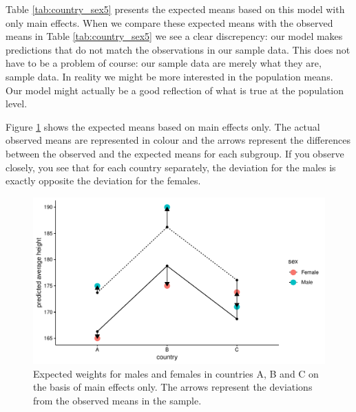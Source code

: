\documentclass[]{book}\usepackage[]{graphicx}\usepackage[]{color}
\makeatletter
\def\maxwidth{ %
  \ifdim\Gin@nat@width>\linewidth
    \linewidth
  \else
    \Gin@nat@width
  \fi
}
\newenvironment{knitrout}{}{} %
\makeatother
\begin{document}
Table \ref{tab:country_sex5} presents the expected means based on this model with only main effects. When we compare these expected means with the observed means in Table \ref{tab:country_sex5} we see a clear discrepency: our model makes predictions that do not match the observations in our sample data. This does not have to be a problem of course: our sample data are merely what they are, sample data. In reality we might be more interested in the population means. Our model might actually be a good reflection of what is true at the population level. 

Figure \ref{fig:country_sex4} shows the expected means based on main effects only. The actual observed means are represented in colour and the arrows represent the differences between the observed and the expected means for each subgroup. If you observe closely, you see that for each country separately, the deviation for the males is exactly opposite the deviation for the females. 

\begin{knitrout}
\color{fgcolor}\begin{figure}

{\centering \includegraphics[width=\maxwidth]{figure/country_sex4-1} 

}

\caption[Expected weights for males and females in countries A, B and C on the basis of main effects only]{Expected weights for males and females in countries A, B and C on the basis of main effects only. The arrows represent the deviations from the observed means in the sample.}\label{fig:country_sex4}
\end{figure}


\end{knitrout}
\end{document}
